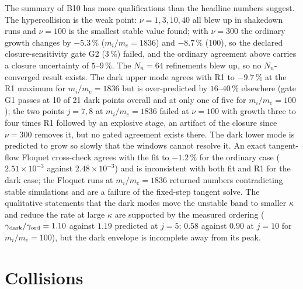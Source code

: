 The summary of B10 has more qualifications than the headline numbers suggest. The hypercollision is the weak point: $\nu=1,3,10,40$ all blew up in shakedown runs and $\nu=100$ is the smallest stable value found; with $\nu=300$ the ordinary growth changes by $-5.3\,\%$ ($m_i/m_e=1836$) and $-8.7\,\%$ (100), so the declared closure-sensitivity gate G2 (3\,\%) failed, and the ordinary agreement above carries a closure uncertainty of $5$--$9\,\%$. The $N_n=64$ refinements blew up, so no $N_n$-converged result exists. The dark upper mode agrees with R1 to $-9.7\,\%$ at the R1 maximum for $m_i/m_e=1836$ but is over-predicted by $16$--$40\,\%$ elsewhere (gate G1 passes at 10 of 21 dark points overall and at only one of five for $m_i/m_e=100$); the two points $j=7,8$ at $m_i/m_e=1836$ failed at $\nu=100$ with growth three to four times R1 followed by an explosive stage, an artifact of the closure since $\nu=300$ removes it, but no gated agreement exists there. The dark lower mode is predicted to grow so slowly that the windows cannot resolve it. An exact tangent-flow Floquet cross-check agrees with the fit to $-1.2\,\%$ for the ordinary case ($2.51\times10^{-3}$ against $2.48\times10^{-3}$) and is inconsistent with both fit and R1 for the dark case; the Floquet runs at $m_i/m_e=1836$ returned numbers contradicting stable simulations and are a failure of the fixed-step tangent solve. The qualitative statements that the dark modes move the unstable band to smaller $\kappa$ and reduce the rate at large $\kappa$ are supported by the measured ordering ($\gamma_{\rm dark}/\gamma_{\rm ord}=1.10$ against $1.19$ predicted at $j=5$; $0.58$ against $0.90$ at $j=10$ for $m_i/m_e=100$), but the dark envelope is incomplete away from its peak.

\section{Collisions}\label{sec:b11}


